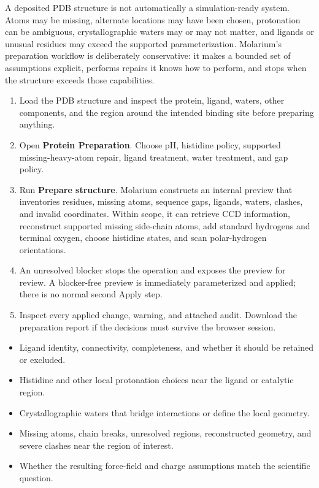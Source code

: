 \documentclass[11pt]{article}
\begin{document}

A deposited PDB structure is not automatically a simulation-ready system. Atoms may be missing, alternate locations may have been chosen, protonation can be ambiguous, crystallographic waters may or may not matter, and ligands or unusual residues may exceed the supported parameterization. Molarium's preparation workflow is deliberately conservative: it makes a bounded set of assumptions explicit, performs repairs it knows how to perform, and stops when the structure exceeds those capabilities.


\begin{enumerate}
\item Load the PDB structure and inspect the protein, ligand, waters, other components, and the region around the intended binding site before preparing anything.
\item Open \textbf{Protein Preparation}. Choose pH, histidine policy, supported missing-heavy-atom repair, ligand treatment, water treatment, and gap policy.
\item Run \textbf{Prepare structure}. Molarium constructs an internal preview that inventories residues, missing atoms, sequence gaps, ligands, waters, clashes, and invalid coordinates. Within scope, it can retrieve CCD information, reconstruct supported missing side-chain atoms, add standard hydrogens and terminal oxygen, choose histidine states, and scan polar-hydrogen orientations.
\item An unresolved blocker stops the operation and exposes the preview for review. A blocker-free preview is immediately parameterized and applied; there is no normal second Apply step.
\item Inspect every applied change, warning, and attached audit. Download the preparation report if the decisions must survive the browser session.
\end{enumerate}


\begin{itemize}
\item Ligand identity, connectivity, completeness, and whether it should be retained or excluded.
\item Histidine and other local protonation choices near the ligand or catalytic region.
\item Crystallographic waters that bridge interactions or define the local geometry.
\item Missing atoms, chain breaks, unresolved regions, reconstructed geometry, and severe clashes near the region of interest.
\item Whether the resulting force-field and charge assumptions match the scientific question.
\end{itemize}
\end{document}
